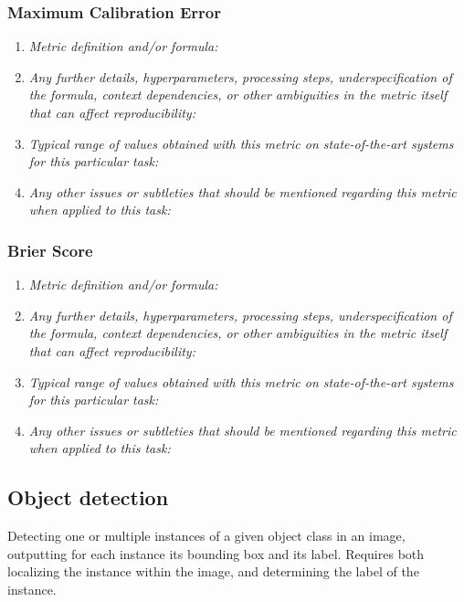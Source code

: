 \documentclass[a4paper,11pt]{article}
\begin{document}
        \subsubsection{Maximum Calibration Error}
            \begin{enumerate}[label=\alph*.]
                \item \textit{Metric definition and/or formula:}
                \bigskip
                \item \textit{Any further details, hyperparameters, processing steps, underspecification of the formula, context dependencies, or other ambiguities in the metric itself that can affect reproducibility:}
                \bigskip
                \item \textit{Typical range of values obtained with this metric on state-of-the-art systems for this particular task:}
                \bigskip
                \item \textit{Any other issues or subtleties that should be mentioned regarding this metric when applied to this task:}
                \bigskip
            \end{enumerate}
        \subsubsection{Brier Score}
            \begin{enumerate}[label=\alph*.]
                \item \textit{Metric definition and/or formula:}
                \bigskip
                \item \textit{Any further details, hyperparameters, processing steps, underspecification of the formula, context dependencies, or other ambiguities in the metric itself that can affect reproducibility:}
                \bigskip
                \item \textit{Typical range of values obtained with this metric on state-of-the-art systems for this particular task:}
                \bigskip
                \item \textit{Any other issues or subtleties that should be mentioned regarding this metric when applied to this task:}
                \bigskip
            \end{enumerate}


    \subsection{Object detection}
        Detecting one or multiple instances of a given object class in an image, outputting for each instance its bounding box and its label. Requires both localizing the instance within the image, and determining the label of the instance.
\end{document}
